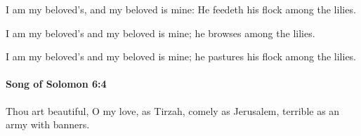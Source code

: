 			\begin{versebox}
					\item[BHS] 
					\item[LXX] 
					\item[ASV] I am my beloved's, and my beloved is mine: He feedeth his flock among the lilies.
					\item[NIV] I am my beloved’s and my beloved is mine; he browses among the lilies.
					\item[NRSV] I am my beloved’s and my beloved is mine; he pastures his flock among the lilies.
			\end{versebox}

		\paragraph{Song of Solomon 6:4} %
			\label{SONGOFSOLOMON-6-4}

			Thou art beautiful, O my love, as Tirzah, comely as Jerusalem, terrible as an army with banners.

